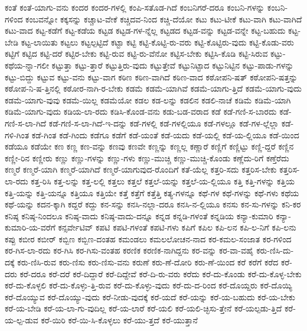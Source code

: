 {ಕಂತೆ
ಕಂತೆ-ಯಾಗು-ವನು
ಕಂದರ
ಕಂದರ-ಗಳಲ್ಲಿ
ಕಂಪಿ-ಸತೊಡ-ಗಿದೆ
ಕಂಬನಿಗರೆ-ದರೂ
ಕಂಬನಿ-ಗಳನ್ನು
ಕಂಬನಿ-ಗಳಿಂದ
ಕಂಬವನ್ನೋ
ಕಕ್ಕಸನ್ನು
ಕಚ್ಚಾಟ-ವೇಕೆ
ಕಚ್ಚಿದವ-ನಿಂದ
ಕಚ್ಚಿ-ದೆಯೋ
ಕಟು
ಕಟು-ಟೀಕೆ
ಕಟು-ವಾಗಿ
ಕಟು-ವಾಗಿದೆ
ಕಟು-ವಾದ
ಕಟ್ಟ-ಕಡೆಗೆ
ಕಟ್ಟ-ಕಡೆಯ
ಕಟ್ಟಡ
ಕಟ್ಟಡ-ಗಳ-ನ್ನೆಲ್ಲ
ಕಟ್ಟಡದ
ಕಟ್ಟಡ-ವನ್ನು
ಕಟ್ಟಡ-ವನ್ನೇ
ಕಟ್ಟ-ಬಹುದು
ಕಟ್ಟ-ಬೇಡಿ
ಕಟ್ಟ-ಲಾಯಿತು
ಕಟ್ಟಲು
ಕಟ್ಟಲ್ಪಟ್ಟಿದೆ
ಕಟ್ಟಾ
ಕಟ್ಟಿ
ಕಟ್ಟಿ-ಕೊಟ್ಟಿ-ರು-ವರು
ಕಟ್ಟಿ-ಕೊಟ್ಟಿರು-ವುದು
ಕಟ್ಟಿ-ಕೊಡು-ವರು
ಕಟ್ಟಿಗೆ
ಕಟ್ಟಿದ
ಕಟ್ಟಿ-ದರೆ
ಕಟ್ಟಿರ-ಬೇಕು
ಕಟ್ಟಿ-ರುವ
ಕಟ್ಟಿ-ರು-ವೆನೋ
ಕಟ್ಟಿಸ-ಬೇಕು
ಕಟ್ಟಿಸಿ-ಕೊಡಿ
ಕಟ್ಟಿ-ಸಿರುವ
ಕಟ್ಟು-ಕಥೆಯ-ನ್ನಾ-ಗಲೀ
ಕಟ್ಟುತ್ತಾ
ಕಟ್ಟು-ತ್ತಾರೆ
ಕಟ್ಟುತ್ತಿರು-ವುದು
ಕಟ್ಟುತ್ತೇವೆ
ಕಟ್ಟುನಿಟ್ಟಾದ
ಕಟ್ಟುನಿಟ್ಟಿನ
ಕಟ್ಟು-ಪಾಡು-ಗಳನ್ನು
ಕಟ್ಟು-ಬಿದ್ದು
ಕಟ್ಟುವ
ಕಟ್ಟು-ವನು
ಕಟ್ಟು-ವಾಗ
ಕಠಿಣ
ಕಠಿಣ-ವಾಗಿದೆ
ಕಠಿಣ-ವಾದ
ಕಠೋಪನಿ-ಷತ್
ಕಠೋಪನಿ-ಷತ್ತನ್ನು
ಕಠೋಪ-ನಿ-ಷ-ತ್ತಿನಲ್ಲಿ
ಕಠೋರ-ನಾಗಿ-ರ-ಬೇಕು
ಕಡಮೆ
ಕಡಮೆ-ಯಾಗಿವೆ
ಕಡಮೆ-ಯಾಗು-ತ್ತಿದೆ
ಕಡಮೆ-ಯಾಗು-ವುದು
ಕಡಮೆ-ಯಾಗು-ವುವು
ಕಡಮೆ-ಯಿಲ್ಲ
ಕಡಮೆಯೋ
ಕಡಲ
ಕಡ-ಲನ್ನು
ಕಡಲಿನ
ಕಡಲಿ-ನಾಚೆ
ಕಡಿಮೆ
ಕಡಿಮೆ-ಯಾಗಿ
ಕಡಿಮೆ-ಯಾಗು-ವುದು
ಕಡಿಯ-ಲಾ-ರದು
ಕಡಿಸಿ-ಕೊಂಡ-ವನು
ಕಡು-ಬಡ-ವರಾದ
ಕಡೆ
ಕಡೆ-ಗಣಿ-ಸ-ಬಾರದು
ಕಡೆ-ಗಣಿ-ಸ-ಲಾ-ಗಿದೆ
ಕಡೆ-ಗಣಿ-ಸ-ಲಾ-ಗಿದೆ-ಇ-ದನ್ನು
ಕಡೆ-ಗಳಲ್ಲಿ
ಕಡೆ-ಗಳಲ್ಲಿಯೂ
ಕಡೆ-ಗಳಲ್ಲೂ
ಕಡೆ-ಗಳ-ಲ್ಲೆಲ್ಲಾ
ಕಡೆ-ಗಳಿ-ಗಿಂತ
ಕಡೆ-ಗಿಂತ
ಕಡೆ-ಗಿಂದು
ಕಡೆಗೂ
ಕಡೆಗೆ
ಕಡೆ-ಯಂತೆ
ಕಡೆ-ಯದು
ಕಡೆ-ಯಲ್ಲಿ
ಕಡೆ-ಯ-ಲ್ಲಿಯೂ
ಕಡೆ-ಯಿಂದ
ಕಡೆಯೂ
ಕಡೆಯೇ
ಕಣ
ಕಣ್ಣ
ಕಣ-ವನ್ನು
ಕಣವು
ಕಣವೇ
ಕಣ್ಣನ್ನು
ಕಣ್ಣಲ್ಲ
ಕಣ್ಣಾರೆ
ಕಣ್ಣಿಗೆ
ಕಣ್ಣಿಟ್ಟು
ಕಣ್ಣಿ-ದ್ದರೆ
ಕಣ್ಣಿನ
ಕಣ್ಣೀ-ರಿನ
ಕಣ್ಣೀರು
ಕಣ್ಣು
ಕಣ್ಣು-ಗಳನ್ನು
ಕಣ್ಣು-ಗಳು
ಕಣ್ಣು-ಮುಚ್ಚಿ
ಕಣ್ಣು-ಮುಚ್ಚಿ-ಕೊಂಡು
ಕಣ್ಣೆದು-ರಿಗೆ
ಕಣ್ತೆರೆದು
ಕಣ್ಮರೆ
ಕಣ್ಮರೆ-ಯಾಗಿ
ಕಣ್ಮರೆ-ಯಾಗಿದೆ
ಕಣ್ಮರೆ-ಯಾಗುವುದ-ರೊಂದಿಗೆ
ಕತೆ-ಯೆಲ್ಲ
ಕತ್ತರಿ-ಸದು
ಕತ್ತರಿಸ-ಬೇಕು
ಕತ್ತರಿಸ-ಲಾ-ರದು
ಕತ್ತ-ರಿಸಿ
ಕತ್ತ-ಲನ್ನು
ಕತ್ತ-ಲಲ್ಲಿ
ಕತ್ತಲು
ಕತ್ತಲೆ
ಕತ್ತಲೆ-ಯನ್ನು
ಕತ್ತಲೆ-ಯ-ಲ್ಲಿಯೂ
ಕತ್ತಿ
ಕತ್ತಿ-ಗಳನ್ನು
ಕತ್ತಿಯ
ಕತ್ತಿ-ಯನ್ನು
ಕತ್ತಿ-ಯನ್ನೂ
ಕತ್ತಿಯೂ
ಕತ್ತಿಯೇ
ಕತ್ತೆ
ಕತ್ತೆಗೆ
ಕತ್ತೆತ್ತಿ
ಕತ್ಯ-ಗಳನ್ನೂ
ಕಥೆ-ಗಳ
ಕಥೆ-ಗಳನ್ನು
ಕಥೆ-ಗಳು
ಕಥೆಯ
ಕಥೆ-ಯನ್ನು
ಕದನ-ಕ್ಕಾಗಿ
ಕದ್ದರೆ
ಕದ್ದು
ಕನ-ಸನ್ನು
ಕನಸಿ-ನಲ್ಲಾ-ದರೂ
ಕನಸಿ-ನ-ಲ್ಲಿಯೂ
ಕನಸು
ಕನ-ಸು-ಗಳನ್ನು
ಕನಿ-ಕರ
ಕನಿಷ್ಠ
ಕನಿಷ್ಠ-ನಿಂದಲೂ
ಕನಿಷ್ಠ-ವಾದು
ಕನಿಷ್ಠ-ವಾದು-ದನ್ನೂ
ಕನ್ನಡ
ಕನ್ನಡಿ-ಗಳಂತೆ
ಕನ್ನಡಿಯ
ಕನ್ಯಾ-ಕುಮಾರಿ
ಕನ್ಯಾ-ಕುಮಾರಿ-ಯ-ವರೆಗೆ
ಕನ್ಸರ್ವೇಟಿವ್
ಕಪಟಿ
ಕಪಟಿ-ಗಳಂತೆ
ಕಪಟಿ-ಗಳು
ಕಪಿಗೆ
ಕಪಿಲ
ಕಪಿ-ಲನ
ಕಪಿ-ಲ-ನಿಗೆ
ಕಪಿ-ಲನು
ಕಪ್ಪು
ಕಬೀರ
ಕಬೀರ್
ಕಬ್ಬಿಣ
ಕಬ್ಬಿಣ-ದಂತಹ
ಕಮಂಡಲು
ಕಮಲಲೋಚನ-ನಾದ
ಕರ-ಕಮಲ-ಸಂಜಾತ
ಕರ-ಗಳಿಂದ
ಕರ-ಗಿಸ-ಲಾ-ರದು
ಕರ-ಗಿಸಿ
ಕರ-ಗಿಸು-ವಂತಹ
ಕರಣಿಕ
ಕರಣಿಕ-ನಾಗಿದ್ದನು
ಕರ-ವನ್ನು
ಕರ-ವಾ-ವಹೈ
ಕರು-ಣಿಸಿ-ದು-ದಕ್ಕೆ
ಕರು-ಣಿಸಿ-ರುವ
ಕರು-ಣಿಸು
ಕರು-ಣಿಸು-ವನು
ಕರುಣೆ
ಕರು-ಣೆ-ದೋರಿ
ಕರು-ಣೆ-ಯಿಂದ
ಕರೆ
ಕರೆಗೆ
ಕರೆದ
ಕರೆ-ದರು
ಕರೆ-ದರೂ
ಕರೆ-ದರೆ
ಕರೆ-ದಿದ್ದಾರೆ
ಕರೆ-ದಿದ್ದೇವೆ
ಕರೆ-ದಿ-ರು-ವರು
ಕರೆದು
ಕರೆ-ದು-ಕೊಂಡು
ಕರೆ-ದು-ಕೊಳ್ಳ-ಬೇಕು
ಕರೆ-ದು-ಕೊಳ್ಳಲಿ
ಕರೆ-ದು-ಕೊಳ್ಳು-ತ್ತಿ-ರುವ
ಕರೆ-ದು-ಕೊಳ್ಳು-ವುದು
ಕರೆ-ದು-ದ-ರಿಂದ
ಕರೆ-ದೊಯ್ದರು
ಕರೆ-ದೊಯ್ಯಿ
ಕರೆ-ದೊಯ್ಯುವ
ಕರೆ-ದೊಯ್ಯು-ವುದು
ಕರೆ-ನೀಡು-ವುದಕ್ಕೆ
ಕರೆ-ಯದೆ
ಕರೆ-ಯನ್ನು
ಕರೆ-ಯ-ಬಹುದು
ಕರೆ-ಯ-ಬೇಕು
ಕರೆ-ಯ-ಬೇಡಿ
ಕರೆ-ಯ-ಲಾ-ಗು-ವುದಿಲ್ಲ
ಕರೆ-ಯ-ಲಾರೆ
ಕರೆ-ಯಲಿ
ಕರೆ-ಯಲಿ-ಚ್ಛಿಸು-ತ್ತೇನೆ
ಕರೆ-ಯಲ್ಪಡು-ತ್ತಿದೆ
ಕರೆ-ಯ-ಲ್ಪ-ಡುವ
ಕರೆ-ಯಿರಿ
ಕರೆ-ಯಿ-ಸಿ-ಕೊಳ್ಳಲು
ಕರೆ-ಯು-ತ್ತದೆ
ಕರೆ-ಯುತ್ತಾನೆ
}
